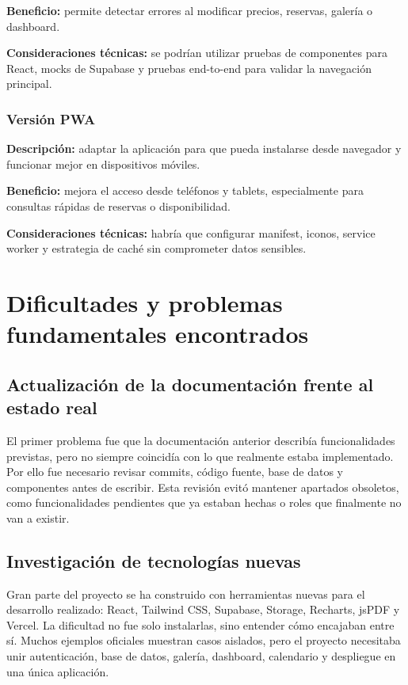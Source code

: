 \documentclass[11pt,a4paper]{article}
\begin{document}
\textbf{Beneficio:} permite detectar errores al modificar precios, reservas, galería o dashboard.

\textbf{Consideraciones técnicas:} se podrían utilizar pruebas de componentes para React, mocks de Supabase y pruebas end-to-end para validar la navegación principal.

\subsubsection{Versión PWA}
\textbf{Descripción:} adaptar la aplicación para que pueda instalarse desde navegador y funcionar mejor en dispositivos móviles.

\textbf{Beneficio:} mejora el acceso desde teléfonos y tablets, especialmente para consultas rápidas de reservas o disponibilidad.

\textbf{Consideraciones técnicas:} habría que configurar manifest, iconos, service worker y estrategia de caché sin comprometer datos sensibles.

\section{Dificultades y problemas fundamentales encontrados}
\subsection{Actualización de la documentación frente al estado real}
El primer problema fue que la documentación anterior describía funcionalidades previstas, pero no siempre coincidía con lo que realmente estaba implementado. Por ello fue necesario revisar commits, código fuente, base de datos y componentes antes de escribir. Esta revisión evitó mantener apartados obsoletos, como funcionalidades pendientes que ya estaban hechas o roles que finalmente no van a existir.

\subsection{Investigación de tecnologías nuevas}
Gran parte del proyecto se ha construido con herramientas nuevas para el desarrollo realizado: React, Tailwind CSS, Supabase, Storage, Recharts, jsPDF y Vercel. La dificultad no fue solo instalarlas, sino entender cómo encajaban entre sí. Muchos ejemplos oficiales muestran casos aislados, pero el proyecto necesitaba unir autenticación, base de datos, galería, dashboard, calendario y despliegue en una única aplicación.
\end{document}
